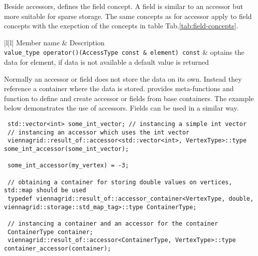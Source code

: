  Beside accessors, {\ViennaGrid} defines the field concept. A field is similar to an accessor but more suitable for sparse storage. The same concepts as for accessor apply to field concepts with the exepction of the concepts in table Tab.\ref{tab:field-concepts}.
 
 \begin{table}[tb]
 \begin{center}
  \begin{tabular}{|l|l|}
   \hline
   Member name & Description \\
   \hline
   \lstinline|value_type operator()(AccessType const & element) const| &  optains the data for element, if data is not available a default value is returned \\
   \hline
  \end{tabular}
 \end{center}
 \caption{Field concepts}
 \label{tab:field-concepts}
 \end{table}
 
 Normally an accessor or field does not store the data on its own. Instead they reference a container where the data is stored. {\ViennaGrid} provides meta-functions and function to define and create accessor or fields from base containers. The example below demonstrates the use of {\ViennaGrid} accessors. Fields can be used in a similar way.
 
 \begin{lstlisting}
 std::vector<int> some_int_vector; // instancing a simple int vector
 // instancing an accessor which uses the int vector
 viennagrid::result_of::accessor<std::vector<int>, VertexType>::type some_int_accessor(some_int_vector);
 
 some_int_accessor(my_vertex) = -3;
 
 // obtaining a container for storing double values on vertices, std::map should be used
 typedef viennagrid::result_of::accessor_container<VertexType, double, viennagrid::storage::std_map_tag>::type ContainerType;
 
 // instancing a container and an accessor for the container
 ContainerType container;
 viennagrid::result_of::accessor<ContainerType, VertexType>::type container_accessor(container);
\end{lstlisting}

